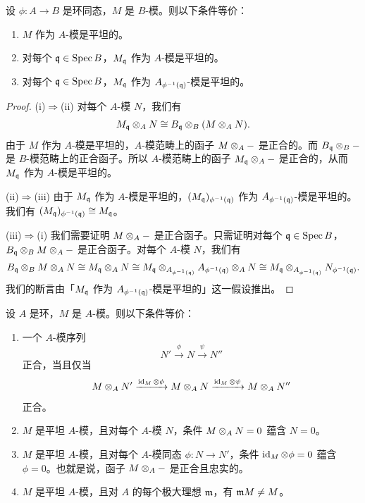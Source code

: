 \begin{proposition}\label{it:2.1.19}
设 $\phi\colon A\to B$ 是环同态，$M$ 是 $B$-模。则以下条件等价：
\begin{enumerate}[label=(\roman*),leftmargin=2.4em]
  \item $M$ 作为 $A$-模是平坦的。
  \item 对每个 $\mathfrak{q}\in\operatorname{Spec} B$，$M_{\mathfrak{q}}$ 作为 $A$-模是平坦的。
  \item 对每个 $\mathfrak{q}\in\operatorname{Spec} B$，$M_{\mathfrak{q}}$ 作为 $A_{\phi^{-1}(\mathfrak{q})}$-模是平坦的。
\end{enumerate}
\end{proposition}
\begin{proof}
(i)$\Rightarrow$(ii) 对每个 $A$-模 $N$，我们有
\[
M_{\mathfrak{q}}\otimes_A N\cong B_{\mathfrak{q}}\otimes_B(M\otimes_A N).
\]
由于 $M$ 作为 $A$-模是平坦的，$A$-模范畴上的函子 $M\otimes_A-$ 是正合的。而 $B_{\mathfrak{q}}\otimes_B-$ 是 $B$-模范畴上的正合函子。所以 $A$-模范畴上的函子 $M_{\mathfrak{q}}\otimes_A-$ 是正合的，从而 $M_{\mathfrak{q}}$ 作为 $A$-模是平坦的。

(ii)$\Rightarrow$(iii) 由于 $M_{\mathfrak{q}}$ 作为 $A$-模是平坦的，$(M_{\mathfrak{q}})_{\phi^{-1}(\mathfrak{q})}$ 作为 $A_{\phi^{-1}(\mathfrak{q})}$-模是平坦的。我们有 $(M_{\mathfrak{q}})_{\phi^{-1}(\mathfrak{q})}\cong M_{\mathfrak{q}}$。

(iii)$\Rightarrow$(i) 我们需要证明 $M\otimes_A-$ 是正合函子。只需证明对每个 $\mathfrak{q}\in\operatorname{Spec} B$，$B_{\mathfrak{q}}\otimes_BM\otimes_A-$ 是正合函子。对每个 $A$-模 $N$，我们有
\[
B_{\mathfrak{q}}\otimes_BM\otimes_AN\cong M_{\mathfrak{q}}\otimes_AN\cong M_{\mathfrak{q}}\otimes_{A_{\phi^{-1}(\mathfrak{q})}}A_{\phi^{-1}(\mathfrak{q})}\otimes_AN\cong M_{\mathfrak{q}}\otimes_{A_{\phi^{-1}(\mathfrak{q})}}N_{\phi^{-1}(\mathfrak{q})}.
\]
我们的断言由「$M_{\mathfrak{q}}$ 作为 $A_{\phi^{-1}(\mathfrak{q})}$-模是平坦的」这一假设推出。
\end{proof}

\begin{proposition}\label{it:2.1.20}
设 $A$ 是环，$M$ 是 $A$-模。则以下条件等价：
\begin{enumerate}[label=(\roman*),leftmargin=2.4em]
  \item 一个 $A$-模序列
  \[
  N'\xrightarrow{\phi}N\xrightarrow{\psi}N''
  \]
  正合，当且仅当
  \[
  M\otimes_AN'\xrightarrow{\operatorname{id}_M\otimes\phi}M\otimes_AN\xrightarrow{\operatorname{id}_M\otimes\psi}M\otimes_AN''
  \]
  正合。
  \item $M$ 是平坦 $A$-模，且对每个 $A$-模 $N$，条件 $M\otimes_AN=0$ 蕴含 $N=0$。
  \item $M$ 是平坦 $A$-模，且对每个 $A$-模同态 $\phi\colon N\to N'$，条件 $\operatorname{id}_M\otimes\phi=0$ 蕴含 $\phi=0$。也就是说，函子 $M\otimes_A-$ 是正合且忠实的。
  \item $M$ 是平坦 $A$-模，且对 $A$ 的每个极大理想 $\mathfrak{m}$，有 $\mathfrak{m} M\ne M$。
\end{enumerate}
\end{proposition}

